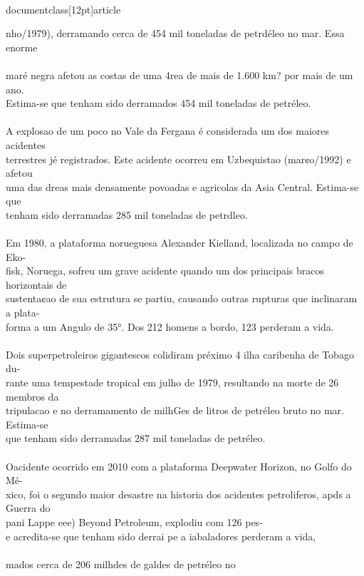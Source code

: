 \\documentclass[12pt]{article}
\begin{document}
{{{{{nho/1979), derramando cerca de 454 mil toneladas de petrdéleo no mar. Essa enorme\\
\\
maré negra afetou as costas de uma 4rea de mais de 1.600 km? por mais de um ano.\\
Estima-se que tenham sido derramados 454 mil toneladas de petréleo.\\
\\
A explosao de um poco no Vale da Fergana é considerada um dos maiores acidentes\\
terrestres jé registrados. Este acidente ocorreu em Uzbequistao (mar¢o/1992) e afetou\\
uma das dreas mais densamente povoadas e agricolas da Asia Central. Estima-se que\\
tenham sido derramadas 285 mil toneladas de petrdleo.\\
\\
Em 1980, a plataforma norueguesa Alexander Kielland, localizada no campo de Eko-\\
fisk, Noruega, sofreu um grave acidente quando um dos principais bracos horizontais de\\
sustenta¢ao de sua estrutura se partiu, causando outras rupturas que inclinaram a plata-\\
forma a um Angulo de 35°. Dos 212 homens a bordo, 123 perderam a vida.\\
\\
Dois superpetroleiros gigantescos colidiram préximo 4 ilha caribenha de Tobago du-\\
rante uma tempestade tropical em julho de 1979, resultando na morte de 26 membros da\\
tripulacao e no derramamento de milhGes de litros de petréleo bruto no mar. Estima-se\\
que tenham sido derramadas 287 mil toneladas de petréleo.\\
\\
Oacidente ocorrido em 2010 com a plataforma Deepwater Horizon, no Golfo do Mé-\\
xico, foi o segundo maior desastre na historia dos acidentes petroliferos, apds a Guerra do\\
pani Lappe eee) Beyond Petroleum, explodiu com 126 pes-\\
e acredita-se que tenham sido derrai pe a iabaladores perderam a vida,\\
\\
mados cerca de 206 milhdes de galdes de petréleo no\\
}}}}}
\end{document}
